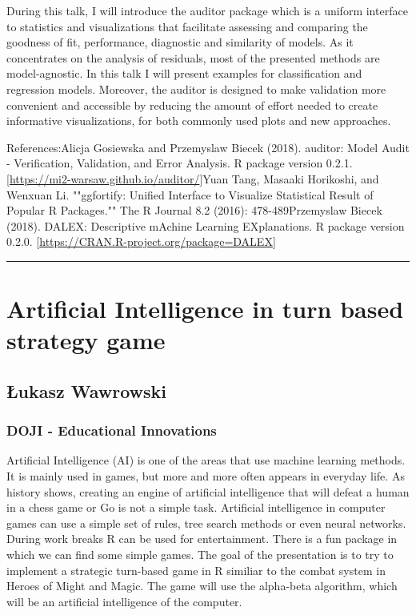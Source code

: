\documentclass [12pt]{article}
\begin{document}
During this talk, I will introduce the auditor package which is a uniform interface to statistics and visualizations that facilitate assessing and comparing the goodness of fit, performance, diagnostic and similarity of models. As it concentrates on the analysis of residuals, most of the presented methods are model-agnostic. In this talk I will present examples for classification and regression models. Moreover, the auditor is designed to make validation more convenient and accessible by reducing the amount of effort needed to create informative visualizations, for both commonly used plots and new approaches.

References:\newline
[]Alicja Gosiewska and Przemyslaw Biecek (2018). auditor: Model Audit - Verification, Validation, and Error Analysis. R package version 0.2.1. [\url{https://mi2-warsaw.github.io/auditor/}]\newline
[]Yuan Tang, Masaaki Horikoshi, and Wenxuan Li. ""ggfortify: Unified Interface to Visualize Statistical Result of Popular R Packages."" The R Journal 8.2 (2016): 478-489\newline
[]Przemyslaw Biecek (2018). DALEX: Descriptive mAchine Learning EXplanations. R package version 0.2.0. [\url{https://CRAN.R-project.org/package=DALEX}]


\noindent\rule{\textwidth}{1pt}
\section{Artificial Intelligence in turn based strategy game}
\subsection*{Łukasz	Wawrowski}
\subsubsection*{DOJI - Educational Innovations}

Artificial Intelligence (AI) is one of the areas that use machine learning methods. It is mainly used in games, but more and more often appears in everyday life. As history shows, creating an engine of artificial intelligence that will defeat a human in a chess game or Go is not a simple task. Artificial intelligence in computer games can use a simple set of rules, tree search methods or even neural networks. During work breaks R can be used for entertainment. There is a fun package in which we can find some simple games. The goal of the presentation is to try to implement a strategic turn-based game in R similiar to the combat system in Heroes of Might and Magic. The game will use the alpha-beta algorithm, which will be an artificial intelligence of the computer.
\end{document}
